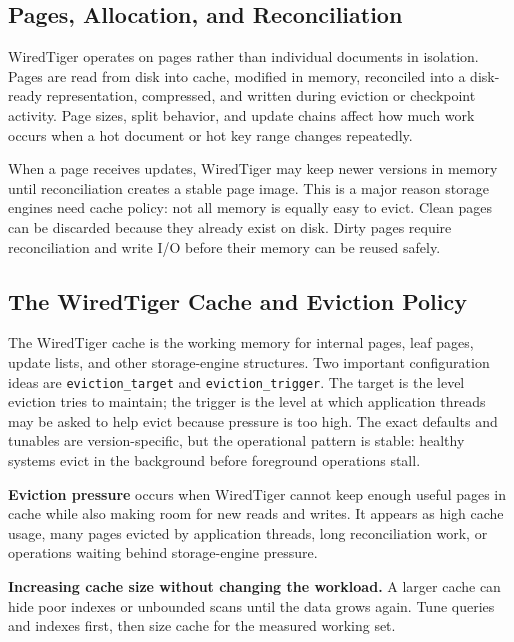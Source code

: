 \subsection{Pages, Allocation, and Reconciliation}
WiredTiger operates on pages rather than individual documents in isolation. Pages are read from disk into cache, modified in memory, reconciled into a disk-ready representation, compressed, and written during eviction or checkpoint activity. Page sizes, split behavior, and update chains affect how much work occurs when a hot document or hot key range changes repeatedly.

When a page receives updates, WiredTiger may keep newer versions in memory until reconciliation creates a stable page image. This is a major reason storage engines need cache policy: not all memory is equally easy to evict. Clean pages can be discarded because they already exist on disk. Dirty pages require reconciliation and write I/O before their memory can be reused safely.

\subsection{The WiredTiger Cache and Eviction Policy}
The WiredTiger cache is the working memory for internal pages, leaf pages, update lists, and other storage-engine structures. Two important configuration ideas are \texttt{eviction\_target} and \texttt{eviction\_trigger}. The target is the level eviction tries to maintain; the trigger is the level at which application threads may be asked to help evict because pressure is too high. The exact defaults and tunables are version-specific, but the operational pattern is stable: healthy systems evict in the background before foreground operations stall.

\begin{definitionbox}
\textbf{Eviction pressure} occurs when WiredTiger cannot keep enough useful pages in cache while also making room for new reads and writes. It appears as high cache usage, many pages evicted by application threads, long reconciliation work, or operations waiting behind storage-engine pressure.
\end{definitionbox}

\begin{pitfall}
\textbf{Increasing cache size without changing the workload.} A larger cache can hide poor indexes or unbounded scans until the data grows again. Tune queries and indexes first, then size cache for the measured working set.
\end{pitfall}

